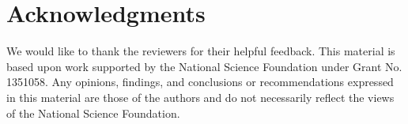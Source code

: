 \documentclass[conference]{IEEEtran}
\begin{document}
\section{Acknowledgments}\label{Acknowledgments}

We would like to thank the reviewers for their helpful feedback. This material
is based upon work supported by the National Science Foundation under Grant No.
1351058. Any opinions, findings, and conclusions or recommendations expressed
in this material are those of the authors and do not necessarily reflect the
views of the National Science Foundation.




 


\end{document}
